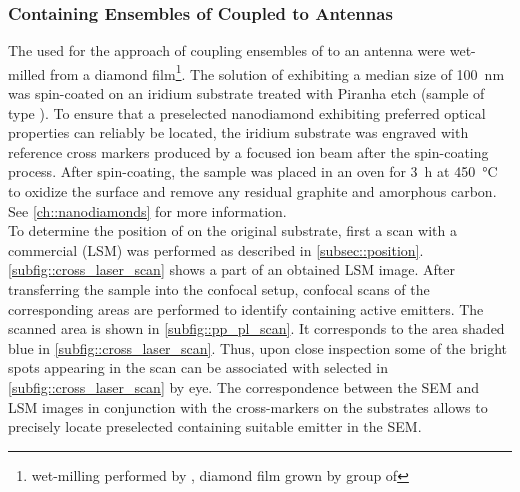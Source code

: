 		\subsubsection{\Nds Containing Ensembles of \sivs Coupled to Antennas}\label{subsubsection::antenna_multiple_sivs}

			The \nds used for the approach of coupling ensembles of \sivs to an antenna were wet-milled from a \CVD diamond film\footnote{wet-milling performed by \muzha, diamond film grown by group of \williams}.
			The solution of \nds exhibiting a median size of \SI{100}{nm} was spin-coated on an iridium substrate treated with Piranha etch (sample of type \insituH).
			To ensure that a preselected nanodiamond exhibiting preferred optical properties can reliably be located, the iridium substrate was engraved with reference cross markers produced by a focused ion beam after the spin-coating process.
			After spin-coating, the sample was placed in an oven for \SI{3}{\hour} at \SI{450}{\celsius} to oxidize the surface and remove any residual graphite and amorphous carbon. See \autoref{ch::nanodiamonds} for more information.
			\\
			To determine the position of \nds on the original substrate, first a scan with a commercial \lsm (LSM) was performed as described in \autoref{subsec::position}.
			\autoref{subfig::cross_laser_scan} shows a part of an obtained LSM image.
			After transferring the sample into the confocal setup, confocal \fl scans of the corresponding areas are performed to identify \nds containing active emitters.
			The scanned area is shown in \autoref{subfig::pp_pl_scan}. It corresponds to the area shaded blue in \autoref{subfig::cross_laser_scan}. Thus, upon close inspection some of the bright spots appearing in the \fl scan can be associated with selected \nds in \autoref{subfig::cross_laser_scan} by eye. The correspondence between the SEM and LSM images in conjunction with the cross-markers on the substrates allows to precisely locate preselected \nds containing suitable emitter in the SEM.

